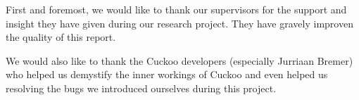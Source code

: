 \documentclass{scrartcl}
\begin{document}
First and foremost, we would like to thank our supervisors for the support and insight they have given during our research project. They have gravely improven the quality of this report.

We would also like to thank the Cuckoo developers (especially Jurriaan Bremer) who helped us demystify the inner workings of Cuckoo and even helped us resolving the bugs we introduced ourselves during this project.

\clearpage




\end{document}
